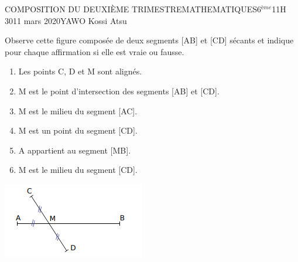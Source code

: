 \documentclass[12pt,a4paper]{book}
\newcommand{\prof}{YAWO Kossi Atsu}
\newcommand{\matiere}{MATHEMATIQUES}
\newcommand{\classe}{6$^{ème}$}
\begin{document}
\begin{devoir}{COMPOSITION DU DEUXIÈME TRIMESTRE}{\matiere}{\classe}{1}{1H 30}{11 mars 2020}{\prof}
\begin{exo}[6]
\setlength{\columnseprule}{1pt}
\begin{multicols}{2}
Observe cette figure composée de deux segments [AB] et [CD] sécants et indique pour chaque affirmation si elle est vraie ou fausse.
\begin{enumerate}
\item Les points C, D et M sont alignés.
\item M est le point d'intersection des segments [AB] et [CD].
\item M est le milieu du segment [AC].
\item M est un point du segment [CD].
\item A appartient au segment [MB].
\item M est le milieu du segment [CD].
\end{enumerate}
\includegraphics[scale=0.9]{images/td_29_02_20_img2.png}
\end{multicols}
\end{exo}
\end{devoir}
\end{document}
